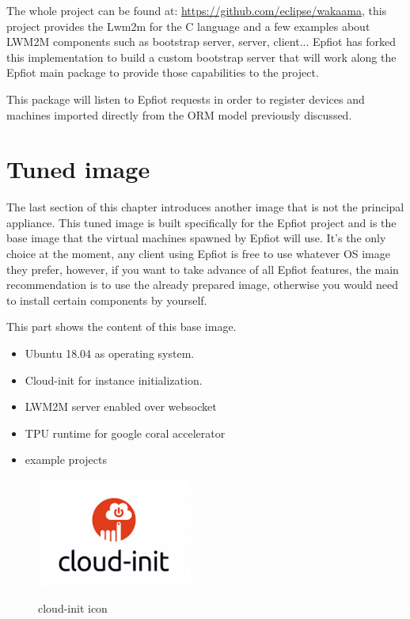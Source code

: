 The whole project can be found at: \url{https://github.com/eclipse/wakaama}, this project provides the Lwm2m for the C language and a few examples about LWM2M components such as bootstrap server, server, client... Epfiot has forked this implementation to build a custom bootstrap server that will work along the Epfiot main package to provide those capabilities to the project.

This package will listen to Epfiot requests in order to register devices and machines imported directly from the ORM model previously discussed.


\newpage
\section{Tuned image}
\label{makereference3.3}

The last section of this chapter introduces another image that is not the principal appliance. This tuned image is built specifically for the Epfiot project and is the base image that the virtual machines spawned by Epfiot will use. It's the only choice at the moment, any client using Epfiot is free to use whatever OS image they prefer, however, if you want to take advance of all Epfiot features, the main recommendation is to use the already prepared image, otherwise you would need to install certain components by yourself.

This part shows the content of this base image.
\begin{itemize}
    \item Ubuntu 18.04 as operating system.
    \item Cloud-init for instance initialization.
    \item LWM2M server enabled over websocket
    \item TPU runtime for google coral accelerator
    \item example projects
\end{itemize}

\begin{figure}[h]%
\centering
    \includegraphics[width=2.0in]{figures/cloud-init.png}
~\caption{cloud-init icon}
\label{figure3.6}
\end{figure}

